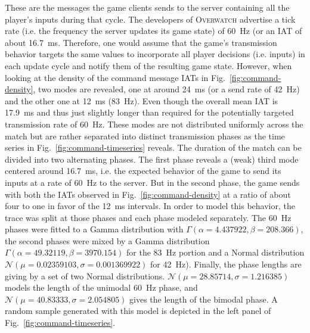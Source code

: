 These are the messages the game clients sends to the server containing all the player's inputs during that cycle. The developers of \textsc{Overwatch} advertise a tick rate (i.e. the frequency the server updates its game state) of \SI{60}{\hertz} (or an \gls{IAT} of about \SI{16.7}{\milli\second}. Therefore, one would assume that the game's transmission behavior targets the same values to incorporate all player decisions (i.e. inputs) in each update cycle and notify them of the resulting game state. However, when looking at the density of the command message \glspl{IAT} in Fig.~\ref{fig:command-density}, two modes are revealed, one at around \SI{24}{\milli\second} (or a send rate of \SI{42}{\hertz}) and the other one at \SI{12}{\milli\second} (\SI{83}{\hertz}). Even though the overall mean \gls{IAT} is \SI{17.9}{\milli\second} and thus just slightly longer than required for the potentially targeted transmission rate of \SI{60}{\hertz}. These modes are not distributed uniformly across the match but are rather separated into distinct transmission phases as the time series in Fig.~\ref{fig:command-timeseries} reveals. The duration of the match can be divided into two alternating phases. The first phase reveals a (weak) third mode centered around \SI{16.7}{\milli\second}, i.e. the expected behavior of the game to send its inputs at a rate of \SI{60}{\hertz} to the server. But in the second phase, the game sends with both the \glspl{IAT} observed in Fig.~\ref{fig:command-density} at a ratio of about four to one in favor of the \SI{12}{\milli\second} intervals. In order to model this behavior, the trace was split at those phases and each phase modeled separately. The \SI{60}{\hertz} phases were fitted to a Gamma distribution with $\Gamma(\alpha = 4.437922, \beta = 208.366)$, the second phases were mixed by a Gamma distribution $\Gamma(\alpha = 49.32119, \beta = 3970.154)$ for the \SI{83}{\hertz} portion and a Normal distribution $\mathcal{N}(\mu = 0.02359103, \sigma = 0.001369922)$ for \SI{42}{\hertz}). Finally, the phase lengths are giving by a set of two Normal distributions. $\mathcal{N}(\mu = 28.85714, \sigma = 1.216385)$ models the length of the unimodal \SI{60}{\hertz} phase, and $\mathcal{N}(\mu = 40.83333, \sigma = 2.054805)$ gives the length of the bimodal phase. A random sample generated with this model is depicted in the left panel of Fig.~\ref{fig:command-timeseries}.


